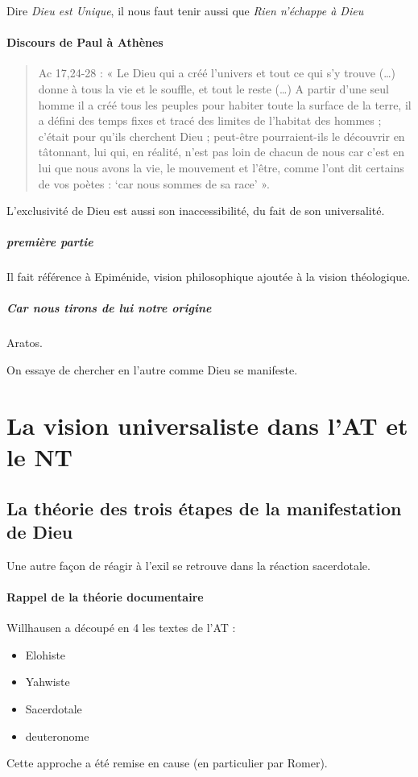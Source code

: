 Dire \emph{Dieu est Unique}, il nous faut tenir aussi que \emph{Rien n'échappe à Dieu}
  

  
\paragraph{Discours de Paul à Athènes}

\begin{quote}
Ac 17,24-28 : « Le Dieu qui a créé l'univers et tout ce qui s'y trouve
(\ldots) donne à tous la vie et le souffle, et tout le reste (\ldots) A
partir d'une seul homme il a créé tous les peuples pour habiter toute la
surface de la terre, il a défini des temps fixes et tracé des limites de
l'habitat des hommes ; c'était pour qu'ils cherchent Dieu ; peut-être
pourraient-ils le découvrir en tâtonnant, lui qui, en réalité, n'est pas
loin de chacun de nous car c'est en lui que nous avons la vie, le
mouvement et l'être, comme l'ont dit certains de vos poètes : `car nous
sommes de sa race' ».
\end{quote}
   
   L'exclusivité de Dieu est aussi son inaccessibilité, du fait de son universalité.
   \subparagraph{première partie} Il fait référence à Epiménide, vision philosophique ajoutée à la vision théologique.
   \subparagraph{Car nous tirons de lui notre origine} Aratos.
    
    
On essaye de chercher en l'autre comme Dieu se manifeste.
\section{La vision universaliste dans l'AT et le NT}




    \subsection{La théorie des trois étapes de la manifestation de Dieu}
 
    
Une autre façon de réagir à l'exil se retrouve dans la réaction sacerdotale. 

\paragraph{Rappel de la théorie documentaire} Willhausen a découpé en 4 les textes de l'AT : 
\begin{itemize}
    \item Elohiste
    \item Yahwiste
    \item Sacerdotale
    \item deuteronome
\end{itemize}
Cette approche a été remise en cause (en particulier par Romer).


